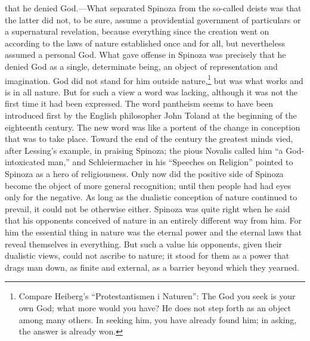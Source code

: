 \documentclass[12pt]{book}
\newcommand{\opage}[1]{\marginnote{\footnotesize\textit{[#1]}}}
\begin{document}
that he denied God.---What separated Spinoza from the so-called deists was that the
latter did not, to be sure, assume a providential government of particulars or a
supernatural revelation, because everything since the creation went on according to the
laws of nature established once and for all, but nevertheless assumed a personal God.
What gave offense in Spinoza was precisely that he denied God as a single, determinate
being, an object of representation and imagination. God did not stand for him outside
nature,\footnote{Compare Heiberg's ``Protestantismen i Naturen'': The God you seek is
your own God; what more would you have? He does not step forth as an object among many
others. In seeking him, you have already found him; in asking, the answer is already
won.} but was what works and is in all nature. But for such a view a word was lacking,
although it was not the first time it had been expressed. The word pantheism seems to
have been introduced first by the English philosopher John Toland at the beginning of
the eighteenth century. The new word was like a portent of the change in conception
that was to take place. Toward the end of the century the greatest \opage{58}minds vied, after Lessing's
example, in praising Spinoza; the pious Novalis called him ``a God-intoxicated man,''
and Schleiermacher in his ``Speeches on Religion'' pointed to Spinoza as a hero of
religiousness. Only now did the positive side of Spinoza become the object of more
general recognition; until then people had had eyes only for the negative. As long as
the dualistic conception of nature continued to prevail, it could not be otherwise
either. Spinoza was quite right when he said that his opponents conceived of nature in
an entirely different way from him. For him the essential thing in nature was the
eternal power and the eternal laws that reveal themselves in everything. But such a
value his opponents, given their dualistic views, could not ascribe to nature; it stood
for them as a power that drags man down, as finite and external, as a barrier beyond
which they yearned.
\end{document}
